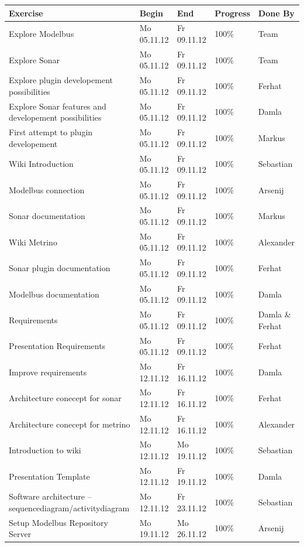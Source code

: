 \setlength{\LTleft}{-0.5cm} 
\begin{longtable}{|p{6cm}|p{2.5cm}|p{2.5cm}|p{1.7cm}|p{1.8cm}|} \hline
\textbf{Exercise} & \textbf{Begin} & \textbf{End} & \textbf{Progress} & \textbf{Done By} \\ \hline
Explore Modelbus & Mo 05.11.12 & Fr 09.11.12 & 100\% & Team \\
Explore Sonar & Mo 05.11.12 & Fr 09.11.12 & 100\% & Team \\ 
Explore plugin developement possibilities & Mo 05.11.12 & Fr 09.11.12 & 100\% & Ferhat \\ 
Explore Sonar features and developement possibilities & Mo 05.11.12 & Fr 09.11.12 & 100\% & Damla \\ 
First attempt to plugin developement & Mo 05.11.12 & Fr 09.11.12 & 100\% & Markus \\ 
Wiki Introduction & Mo 05.11.12 & Fr 09.11.12 & 100\% & Sebastian \\ 
Modelbus connection & Mo 05.11.12 & Fr 09.11.12 & 100\% & Arsenij \\ 
Sonar documentation & Mo 05.11.12 & Fr 09.11.12 & 100\% & Markus \\ 
Wiki Metrino & Mo 05.11.12 & Fr 09.11.12 & 100\% & Alexander \\ 
Sonar plugin documentation & Mo 05.11.12 & Fr 09.11.12 & 100\% & Ferhat \\ 
Modelbus documentation & Mo 05.11.12 & Fr 09.11.12 & 100\% & Damla \\ 
Requirements & Mo 05.11.12 & Fr 09.11.12 & 100\% & Damla \& Ferhat \\ 
Presentation Requirements & Mo 05.11.12 & Fr 09.11.12 & 100\% & Ferhat \\ 
Improve requirements & Mo 12.11.12 & Fr 16.11.12 & 100\% & Damla \\
Architecture conecept for sonar & Mo 12.11.12 & Fr 16.11.12 & 100\% & Ferhat \\ 
Architecture conecept for metrino & Mo 12.11.12 & Fr 16.11.12 & 100\% & Alexander \\ 
Introduction to wiki & Mo 12.11.12 & Mo 19.11.12 & 100\% & Sebastian \\ 
Presentation Template & Mo 12.11.12 & Fr 19.11.12 & 100\% & Damla \\ 
Software architecture – sequencediagram/activitydiagram & Mo 12.11.12 & Fr 23.11.12 & 100\% & Sebastian \\ 
Setup Modelbus Repository Server & Mo 19.11.12 & Mo 26.11.12 & 100\% & Arsenij \\ 

\end{longtable}
